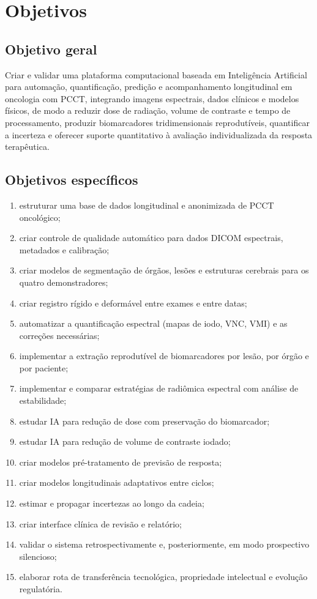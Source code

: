 \documentclass[11pt,a4paper]{article}
\begin{document}
\section{Objetivos}

\subsection{Objetivo geral}

Criar e validar uma plataforma computacional baseada em Inteligência Artificial para automação, quantificação, predição e acompanhamento longitudinal em oncologia com PCCT, integrando imagens espectrais, dados clínicos e modelos físicos, de modo a reduzir dose de radiação, volume de contraste e tempo de processamento, produzir biomarcadores tridimensionais reprodutíveis, quantificar a incerteza e oferecer suporte quantitativo à avaliação individualizada da resposta terapêutica.

\subsection{Objetivos específicos}

\begin{enumerate}
\item estruturar uma base de dados longitudinal e anonimizada de PCCT oncológico;
\item criar controle de qualidade automático para dados DICOM espectrais, metadados e calibração;
\item criar modelos de segmentação de órgãos, lesões e estruturas cerebrais para os quatro demonstradores;
\item criar registro rígido e deformável entre exames e entre datas;
\item automatizar a quantificação espectral (mapas de iodo, VNC, VMI) e as correções necessárias;
\item implementar a extração reprodutível de biomarcadores por lesão, por órgão e por paciente;
\item implementar e comparar estratégias de radiômica espectral com análise de estabilidade;
\item estudar IA para redução de dose com preservação do biomarcador;
\item estudar IA para redução de volume de contraste iodado;
\item criar modelos pré-tratamento de previsão de resposta;
\item criar modelos longitudinais adaptativos entre ciclos;
\item estimar e propagar incertezas ao longo da cadeia;
\item criar interface clínica de revisão e relatório;
\item validar o sistema retrospectivamente e, posteriormente, em modo prospectivo silencioso;
\item elaborar rota de transferência tecnológica, propriedade intelectual e evolução regulatória.
\end{enumerate}
\end{document}
